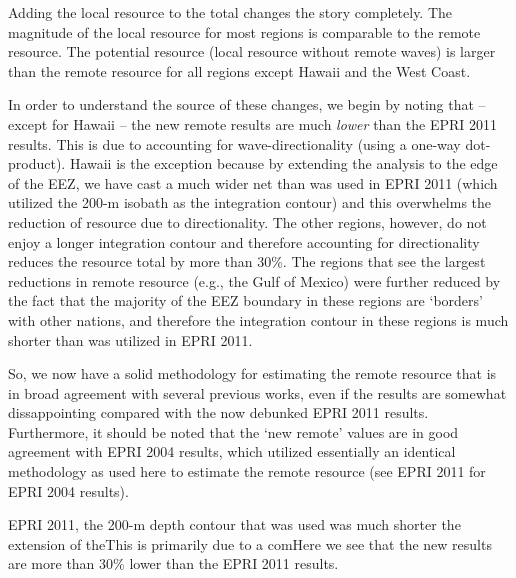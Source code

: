 Adding the local resource to the total changes the story completely. The magnitude of the local resource for most regions is comparable to the remote resource. The potential resource (local resource without remote waves) is larger than the remote resource for all regions except Hawaii and the West Coast.


In order to understand the source of these changes, we begin by noting that -- except for Hawaii -- the new remote results are much {\em lower} than the EPRI 2011 results. This is due to accounting for wave-directionality (using a one-way dot-product). Hawaii is the exception because by extending the analysis to the edge of the EEZ, we have cast a much wider net than was used in EPRI 2011 (which utilized the 200-m isobath as the integration contour) and this overwhelms the reduction of resource due to directionality. The other regions, however, do not enjoy a longer integration contour and therefore accounting for directionality reduces the resource total by more than 30\%. The regions that see the largest reductions in remote resource (e.g., the Gulf of Mexico) were further reduced by the fact that the majority of the EEZ boundary in these regions are `borders' with other nations, and therefore the integration contour in these regions is much shorter than was utilized in EPRI 2011.

So, we now have a solid methodology for estimating the remote resource that is in broad agreement with several previous works, even if the results are somewhat dissappointing compared with the now debunked EPRI 2011 results. Furthermore, it should be noted that the `new remote' values are in good agreement with EPRI 2004 results, which utilized essentially an identical methodology as used here to estimate the remote resource (see EPRI 2011 for EPRI 2004 results).


EPRI 2011, the 200-m depth contour that was used was much shorter the extension of theThis is primarily due to a comHere we see that the new results are more than 30\% lower than the EPRI 2011 results.

